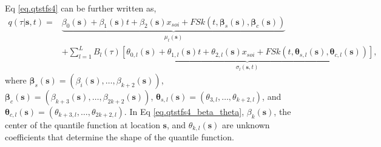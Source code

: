 \documentclass[fleqn,10pt]{wlscirep}
\newcommand{\bs}{\mathbf{s}}
\newcommand{\qtst}{q(\tau | \bs, t)}
\begin{document}
Eq \eqref{eq.qtstfs4} can be further written as,
\begin{equation}\label{eq.qtstfs4_beta_theta}
	\begin{split}
		\qtst=&\underbrace{\beta_0( \bs)+ \beta_1(\bs)t + \beta_2(\bs) x_{soi} + FSk(t,\boldsymbol{\beta}_s(\bs),\boldsymbol{\beta}_c(\bs))}_{\mu_t(\bs)}   \\
		&+\sum_{l=1}^{L}B_l(\tau) \underbrace{\left[\theta_{0,l}(\bs)+\theta_{1,l}(\bs)t + \theta_{2,l}(\bs)x_{soi} +FSk(t,\boldsymbol{\theta}_{s,l}(\bs),\boldsymbol{\theta}_{c,l}(\bs))  \right]}_{\sigma_l(\bs,t)},
	\end{split}
\end{equation}
where $\boldsymbol{\beta}_s(\bs)= (\beta_i(\bs),\ldots,\beta_{k+2}(\bs))$, $\boldsymbol{\beta}_c(\bs)= (\beta_{k+3}(\bs),\ldots,\beta_{2k+2}(\bs))$, $\boldsymbol{\theta}_{s,l}(\bs)= (\theta_{3, l},\ldots,\theta_{k+2, l})$, and $\boldsymbol{\theta}_{c,l}(\bs)= (\theta_{k+3, l},\ldots,\theta_{2k+2, l})$. In Eq \eqref{eq.qtstfs4_beta_theta}, $\beta_k(\bs)$, the center of the quantile function at location $\bs$, and $\theta_{k,l}(\bs)$ are unknown coefficients that determine the shape of the quantile function.
\end{document}
